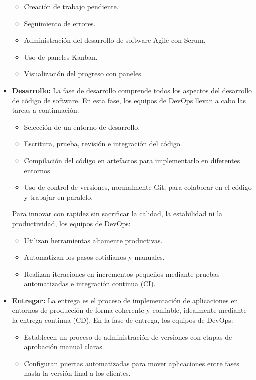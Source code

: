 \begin{itemize}
         \begin{itemize}
            \item Creación de trabajo pendiente.
            \item Seguimiento de errores.
            \item Administración del desarrollo de software Agile con Scrum.
            \item Uso de paneles Kanban.
            \item Visualización del progreso con paneles.
          \end{itemize}
    \item \textbf{Desarrollo: }La fase de desarrollo comprende todos los aspectos del desarrollo de código de software. En esta fase, los equipos de DevOps llevan a cabo las tareas a continuación:
         \begin{itemize}
            \item Selección de un entorno de desarrollo.
            \item Escritura, prueba, revisión e integración del código.
            \item Compilación del código en artefactos para implementarlo en diferentes entornos.
            \item Uso de control de versiones, normalmente Git, para colaborar en el código y trabajar en paralelo.
         \end{itemize}
     Para innovar con rapidez sin sacrificar la calidad, la estabilidad ni la productividad, los equipos de DevOps:
         \begin{itemize}
            \item Utilizan herramientas altamente productivas.
            \item Automatizan los pasos cotidianos y manuales.
            \item Realizan iteraciones en incrementos pequeños mediante pruebas automatizadas e integración continua (CI).
        \end{itemize}
    \item \textbf{Entregar: }La entrega es el proceso de implementación de aplicaciones en entornos de producción de forma coherente y confiable, idealmente mediante la entrega continua (CD). En la fase de entrega, los equipos de DevOps:
        \begin{itemize}
            \item Establecen un proceso de administración de versiones con etapas de aprobación manual claras.
            \item Configuran puertas automatizadas para mover aplicaciones entre fases hasta la versión final a los clientes.

\end{itemize}
\end{itemize}
